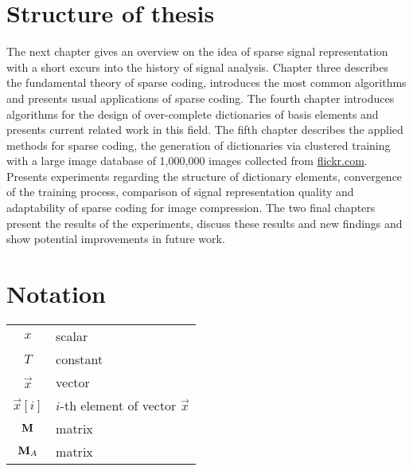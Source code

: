 \section{Structure of thesis}
The next chapter gives an overview on the idea of sparse signal
representation with a short excurs into the history of signal analysis.
Chapter three describes the fundamental theory of sparse coding, introduces the
most common algorithms and presents usual applications of sparse coding. The
fourth chapter introduces algorithms for the design of over-complete
dictionaries of basis elements and presents current related work in this field.
The fifth chapter describes the applied methods for sparse
coding, the generation of dictionaries via clustered training with a large image
database of 1,000,000 images collected from \url{flickr.com}. Presents
experiments regarding the structure of dictionary elements, convergence of the
training process, comparison of signal representation quality and adaptability
of sparse coding for image compression. The two final chapters present the
results of the experiments, discuss these results and new findings and show
potential improvements in future work. 

\section*{Notation}
\begin{tabular}{c l}
$x$ & scalar\\
$T$ & constant\\
$\vec{x}$ & vector\\
$\vec{x}[i]$ & $i$-th element of vector $\vec{x}$\\
$\boldsymbol{\mathrm{M}}$ & matrix\\
$\boldsymbol{\mathrm{M}}_A$ & matrix\\
\end{tabular}



